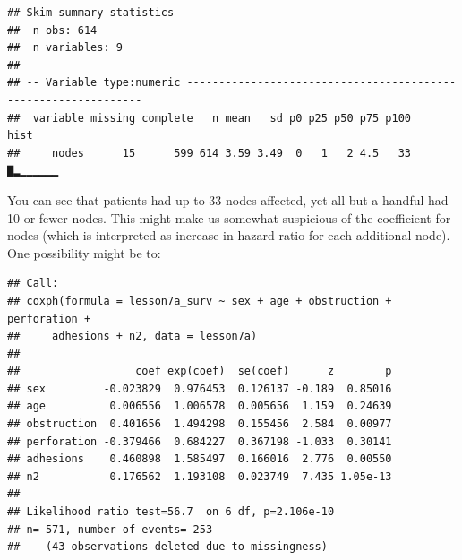 \documentclass[]{book}
\newenvironment{Shaded}{\begin{snugshade}}{\end{snugshade}}
\newcommand{\CommentTok}[1]{\textcolor[rgb]{0.56,0.35,0.01}{\textit{#1}}}
\newcommand{\DataTypeTok}[1]{\textcolor[rgb]{0.13,0.29,0.53}{#1}}
\newcommand{\DecValTok}[1]{\textcolor[rgb]{0.00,0.00,0.81}{#1}}
\newcommand{\KeywordTok}[1]{\textcolor[rgb]{0.13,0.29,0.53}{\textbf{#1}}}
\newcommand{\NormalTok}[1]{#1}
\newcommand{\OperatorTok}[1]{\textcolor[rgb]{0.81,0.36,0.00}{\textbf{#1}}}
\newcommand{\StringTok}[1]{\textcolor[rgb]{0.31,0.60,0.02}{#1}}
\begin{document}
\begin{verbatim}
## Skim summary statistics
##  n obs: 614 
##  n variables: 9 
## 
## -- Variable type:numeric ---------------------------------------------------------------
##  variable missing complete   n mean   sd p0 p25 p50 p75 p100     hist
##     nodes      15      599 614 3.59 3.49  0   1   2 4.5   33 ▇▂▁▁▁▁▁▁
\end{verbatim}

You can see that patients had up to 33 nodes affected, yet all but a handful had 10 or fewer nodes. This might make us somewhat suspicious of the coefficient for nodes (which is interpreted as increase in hazard ratio for each additional node). One possibility might be to:

\begin{Shaded}
\end{Shaded}

\begin{verbatim}
## Call:
## coxph(formula = lesson7a_surv ~ sex + age + obstruction + perforation + 
##     adhesions + n2, data = lesson7a)
## 
##                  coef exp(coef)  se(coef)      z        p
## sex         -0.023829  0.976453  0.126137 -0.189  0.85016
## age          0.006556  1.006578  0.005656  1.159  0.24639
## obstruction  0.401656  1.494298  0.155456  2.584  0.00977
## perforation -0.379466  0.684227  0.367198 -1.033  0.30141
## adhesions    0.460898  1.585497  0.166016  2.776  0.00550
## n2           0.176562  1.193108  0.023749  7.435 1.05e-13
## 
## Likelihood ratio test=56.7  on 6 df, p=2.106e-10
## n= 571, number of events= 253 
##    (43 observations deleted due to missingness)
\end{verbatim}
\end{document}
